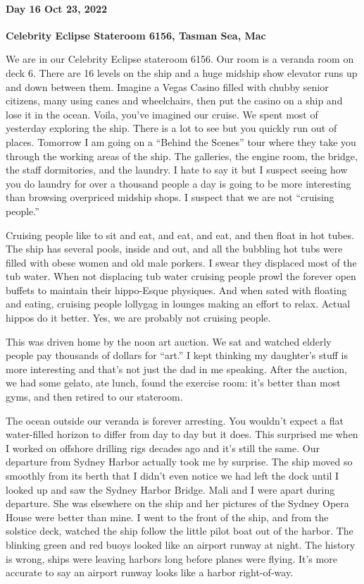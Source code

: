 \hypertarget{day-16-oct-23-2022}{%
\paragraph{\texorpdfstring{\textbf{Day 16 Oct 23, 2022}}{Day 16 Oct 23, 2022}}\label{day-16-oct-23-2022}}

\textbf{Celebrity Eclipse Stateroom 6156, Tasman Sea, Mac}

We are in our Celebrity Eclipse stateroom 6156. Our room is a veranda
room on deck 6. There are 16 levels on the ship and a huge midship show
elevator runs up and down between them. Imagine a Vegas Casino filled
with chubby senior citizens, many using canes and wheelchairs, then put
the casino on a ship and lose it in the ocean. Voila, you've imagined
our cruise. We spent most of yesterday exploring the ship. There is a
lot to see but you quickly run out of places. Tomorrow I am going on a
``Behind the Scenes'' tour where they take you through the working areas
of the ship. The galleries, the engine room, the bridge, the staff
dormitories, and the laundry. I hate to say it but I suspect seeing how
you do laundry for over a thousand people a day is going to be more
interesting than browsing overpriced midship shops. I suspect that we
are not ``cruising people.''

Cruising people like to sit and eat, and eat, and eat, and then float in
hot tubes. The ship has several pools, inside and out, and all the
bubbling hot tubs were filled with obese women and old male porkers. I
swear they displaced most of the tub water. When not displacing tub
water cruising people prowl the forever open buffets to maintain their
hippo-Esque physiques. And when sated with floating and eating, cruising
people lollygag in lounges making an effort to relax. Actual hippos do
it better. Yes, we are probably not cruising people.

This was driven home by the noon art auction. We sat and watched elderly
people pay thousands of dollars for ``art.'' I kept thinking my
daughter's stuff is more interesting and that's not just the dad in me
speaking. After the auction, we had some gelato, ate lunch, found the
exercise room: it's better than most gyms, and then retired to our
stateroom.

The ocean outside our veranda is forever arresting. You wouldn't expect
a flat water-filled horizon to differ from day to day but it does. This
surprised me when I worked on offshore drilling rigs decades ago and
it's still the same. Our departure from Sydney Harbor actually took me
by surprise. The ship moved so smoothly from its berth that I didn't
even notice we had left the dock until I looked up and saw the Sydney
Harbor Bridge. Mali and I were apart during departure. She was elsewhere
on the ship and her pictures of the Sydney Opera House were better than
mine. I went to the front of the ship, and from the solstice deck,
watched the ship follow the little pilot boat out of the harbor. The
blinking green and red buoys looked like an airport runway at night. The
history is wrong, ships were leaving harbors long before planes were
flying. It's more accurate to say an airport runway looks like a harbor
right-of-way.

